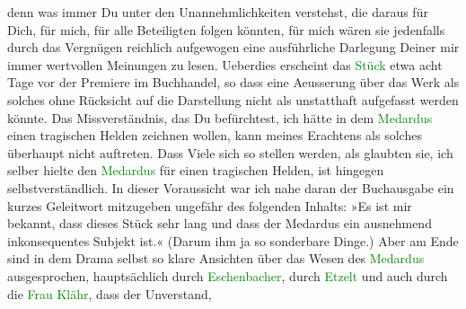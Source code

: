                denn was immer Du unter den Unannehmlichkeiten verstehst, die daraus für Dich, für
               mich, für alle Beteiligten folgen könnten, für mich wären sie jedenfalls durch das
               Vergnügen reichlich aufgewogen eine ausführliche Darlegung Deiner mir immer
               wertvollen Meinungen zu lesen. Ueberdies erscheint das \textcolor{green}{Stück}{} etwa \label{LL120-1v}acht Tage
                  vor der Premiere im Buchhandel\label{LL120-1h}, so dass eine Aeusserung über das Werk als
               solches ohne Rücksicht auf die Darstellung nicht als unstatthaft aufgefasst werden
               könnte.\pend
           \pstart
           Das Missverständnis, das Du befürchtest, ich hätte in dem \textcolor{green}{Medardus}{} einen tragischen Helden zeichnen
               wollen, kann meines Erachtens als solches überhaupt nicht auftreten. Dass Viele sich
               so stellen werden, als glaubten sie, ich selber hielte den \textcolor{green}{Medardus}{} für einen tragischen Helden, ist
               hingegen selbstverständlich. In {\pb}dieser Voraussicht war
               ich nahe daran der Buchausgabe ein kurzes Geleitwort mitzugeben ungefähr des
               folgenden Inhalts: \introOben{}»\introOben{}Es ist mir bekannt, dass dieses Stück
               sehr lang und dass der Medardus ein ausnehmend inkonsequentes Subjekt ist.\introOben{}« (\introOben{}Darum \label{T_L01981_1v}\label{T_L01981_1h} ihm ja so sonderbare Dinge.\introOben{})\introOben{} Aber am
               Ende sind in dem Drama selbst so klare Ansichten über das Wesen des \textcolor{green}{Medardus}{} ausgesprochen, hauptsächlich durch
                  \textcolor{green}{Eschenbacher}{}, durch \textcolor{green}{Etzelt}{} und auch durch die \textcolor{green}{Frau Klähr}{}, dass der Unverstand,
